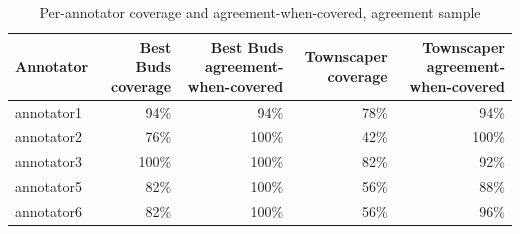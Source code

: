 \begin{table}[t]
\centering
\caption{Per-annotator coverage and agreement-when-covered, agreement sample}
\label{tab:rq5-coverage-agreement}
\begin{tabular}{lrrrr}
\toprule
Annotator & Best Buds coverage & Best Buds agreement-when-covered & Townscaper coverage & Townscaper agreement-when-covered \\
\midrule
annotator1 & 94\% & 94\% & 78\% & 94\% \\
annotator2 & 76\% & 100\% & 42\% & 100\% \\
annotator3 & 100\% & 100\% & 82\% & 92\% \\
annotator5 & 82\% & 100\% & 56\% & 88\% \\
annotator6 & 82\% & 100\% & 56\% & 96\% \\
\bottomrule
\end{tabular}
\end{table}
